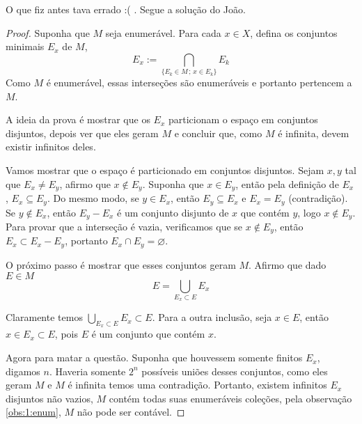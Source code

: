 O que fiz antes tava errado :( . Segue a solução do João. 
\begin{proof}
    Suponha que $M$ seja enumerável. Para cada $x \in X$, defina os conjuntos minimais $E_x$ de $M$,
    $$E_x := \bigcap\limits_{\{E_k \in M\, ;\, x \in E_k\}} E_k$$
    Como $M$ é enumerável, essas interseções são enumeráveis e portanto pertencem a $M$. 
    
    A ideia da prova é mostrar que os $E_x$ particionam o espaço em conjuntos disjuntos, depois ver que eles geram $M$ e 
    concluir que, como $M$ é infinita, devem existir infinitos deles.


    
    Vamos mostrar que o espaço é particionado em conjuntos disjuntos. Sejam $x,y$ tal que $E_x \neq E_y$, afirmo que
    $x \not \in E_y$. Suponha que $x \in E_y$, então pela definição de $E_x$, $E_x \subseteq E_y$. Do mesmo modo, se 
    $y \in E_x$, então $E_y \subseteq E_x$ e $E_x = E_y$ (contradição). Se $y \not \in E_x$, então $E_y - E_x$ é um conjunto disjunto de $x$ que contém $y$,
    logo $x \not \in E_y$. Para provar que a interseção é vazia, verificamos que se $x \not \in E_y$, então $E_x \subset E_x - E_y$, 
    portanto $E_x \cap E_y = \varnothing$.

    O próximo passo é mostrar que esses conjuntos geram $M$. Afirmo que dado $E \in M$
    $$E = \bigcup\limits_{E_x \subset E} E_x$$
    
    Claramente temos $\bigcup_{E_x \subset E} E_x \subset E$. Para a outra inclusão, seja $x \in E$, então $x \in E_x \subset E$, pois $E$ é um conjunto
    que contém $x$.

    Agora para matar a questão. Suponha que houvessem somente finitos $E_x$, digamos $n$. Haveria somente $2^n$ possíveis uniões desses conjuntos, como
    eles geram $M$ e $M$ é infinita temos uma contradição. Portanto, existem infinitos $E_x$ disjuntos não vazios, $M$ contém todas suas enumeráveis coleções,
    pela observação \ref{obs:1:enum}, $M$ não pode ser contável.



\end{proof}
